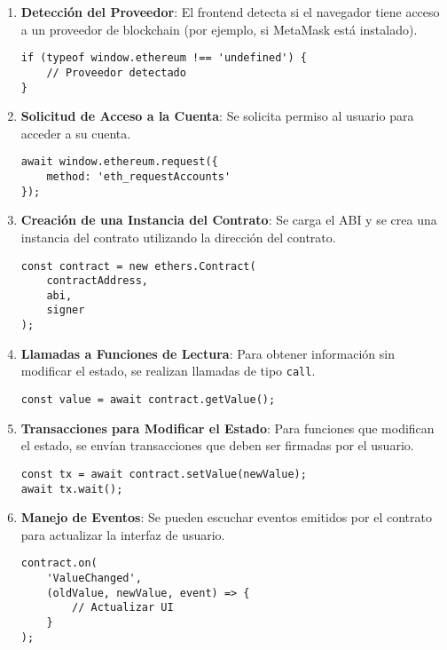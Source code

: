 \begin{enumerate}
    \item \textbf{Detección del Proveedor}: El frontend detecta si el navegador tiene acceso a un proveedor de blockchain (por ejemplo, si MetaMask está instalado).

    \begin{lstlisting}
if (typeof window.ethereum !== 'undefined') {
    // Proveedor detectado
}
    \end{lstlisting}

    \item \textbf{Solicitud de Acceso a la Cuenta}: Se solicita permiso al usuario para acceder a su cuenta.

    \begin{lstlisting}
await window.ethereum.request({
    method: 'eth_requestAccounts'
});
    \end{lstlisting}

    \item \textbf{Creación de una Instancia del Contrato}: Se carga el ABI y se crea una instancia del contrato utilizando la dirección del contrato.

    \begin{lstlisting}
const contract = new ethers.Contract(
    contractAddress,
    abi,
    signer
);
    \end{lstlisting}

    \item \textbf{Llamadas a Funciones de Lectura}: Para obtener información sin modificar el estado, se realizan llamadas de tipo \texttt{call}.

    \begin{lstlisting}
const value = await contract.getValue();
    \end{lstlisting}

    \item \textbf{Transacciones para Modificar el Estado}: Para funciones que modifican el estado, se envían transacciones que deben ser firmadas por el usuario.

    \begin{lstlisting}
const tx = await contract.setValue(newValue);
await tx.wait();
    \end{lstlisting}

    \item \textbf{Manejo de Eventos}: Se pueden escuchar eventos emitidos por el contrato para actualizar la interfaz de usuario.

    \begin{lstlisting}
contract.on(
    'ValueChanged',
    (oldValue, newValue, event) => {
        // Actualizar UI
    }
);
    \end{lstlisting}

\end{enumerate}

